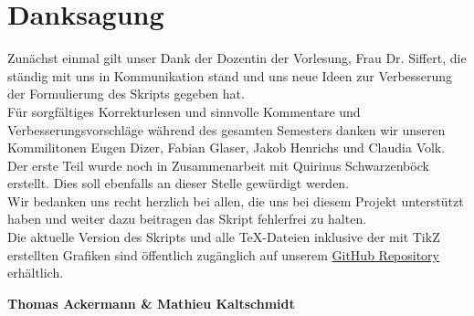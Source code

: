 \chapter*{Danksagung}
Zunächst einmal gilt unser Dank der Dozentin der Vorlesung, Frau Dr. Siffert, die ständig mit uns in Kommunikation stand und uns neue Ideen zur Verbesserung der Formulierung des Skripts gegeben hat. \\

Für sorgfältiges Korrekturlesen und sinnvolle Kommentare und Verbesserungsvorschläge während des gesamten Semesters danken wir unseren Kommilitonen Eugen Dizer, Fabian Glaser, Jakob Henrichs und Claudia Volk.\\

Der erste Teil wurde noch in Zusammenarbeit mit Quirinus Schwarzenböck erstellt. Dies soll ebenfalls an dieser Stelle gewürdigt werden. \\

Wir bedanken uns recht herzlich bei allen, die uns bei diesem Projekt unterstützt haben und weiter dazu beitragen das Skript fehlerfrei zu halten.  \\

Die aktuelle Version des Skripts und alle TeX-Dateien inklusive der mit TikZ erstellten Grafiken sind öffentlich zugänglich auf unserem \href{https://github.com/mathieukaltschmidt/diffgeo}{GitHub Repository} erhältlich. \begin{center}
\textbf{Thomas Ackermann \& Mathieu Kaltschmidt}	
\end{center}

\blankpage
